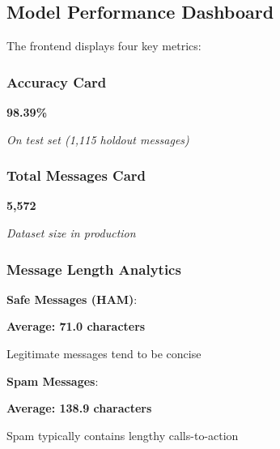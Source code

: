 \documentclass[12pt, a4paper]{article}
\begin{document}
\subsection{Model Performance Dashboard}

The frontend displays four key metrics:

\subsubsection{Accuracy Card}

\begin{center}
\begin{tcolorbox}[colback=white, colframe=accentpurple, title=\textbf{Model Accuracy}, width=8cm]
    \centering\Large\textbf{98.39\%}
    
    \small\textit{On test set (1,115 holdout messages)}
\end{tcolorbox}
\end{center}

\subsubsection{Total Messages Card}

\begin{center}
\begin{tcolorbox}[colback=white, colframe=success, title=\textbf{Total Training Messages}, width=8cm]
    \centering\Large\textbf{5,572}
    
    \small\textit{Dataset size in production}
\end{tcolorbox}
\end{center}

\subsubsection{Message Length Analytics}

\textbf{Safe Messages (HAM)}:
\begin{center}
\begin{tcolorbox}[colback=white, colframe=success, width=8cm, height=2cm]
    \Large\textbf{Average: 71.0 characters}
    
    \small Legitimate messages tend to be concise
\end{tcolorbox}
\end{center}

\textbf{Spam Messages}:
\begin{center}
\begin{tcolorbox}[colback=white, colframe=danger, width=8cm, height=2cm]
    \Large\textbf{Average: 138.9 characters}
    
    \small Spam typically contains lengthy calls-to-action
\end{tcolorbox}
\end{center}
\end{document}
